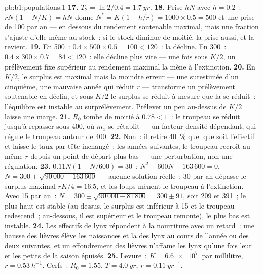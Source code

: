 \begin{solution}{pb:b1:populations:1}
\textbf{17.} $T_2 = \ln 2/0.4 = \qty{1.7}{yr}$.
\textbf{18.} Prise $hN$ avec $h = 0.2$~: $rN(1 - N/K) = hN$ donne $N^* =
K(1 - h/r) = 1000\times 0.5 = 500$ et une prise de \num{100} par an ---
en dessous du rendement soutenable maximal, mais une fraction s'ajuste
d'elle-même au stock~: si le stock diminue de moitié, la prise aussi, et
la  revient.
\textbf{19.} En 500~: $0.4\times 500\times 0.5 = 100 < 120$~: la
 décline. En 300~: $0.4\times 300\times 0.7 = 84 < 120$~: elle
décline plus vite --- une fois sous $K/2$, un prélèvement fixe supérieur
au rendement maximal la mène à l'extinction.
\textbf{20.} En $K/2$, le surplus est maximal mais la moindre erreur ---
une  surestimée d'un cinquième, une mauvaise année qui réduit
$r$ --- transforme un prélèvement soutenable en déclin, et sous $K/2$ le
surplus se réduit à mesure que la  se réduit~: l'équilibre est
instable au surprélèvement. Prélever un peu au-dessus de $K/2$ laisse
une marge.
\textbf{21.} $R_0$ tombe de moitié à $0.78 < 1$~: le troupeau se réduit
jusqu'à repasser sous 400, où $m_x$ se rétablit --- un facteur
densité-dépendant, qui régule le troupeau autour de 400.
\textbf{22.} Non~: il retire \qty{40}{\%} quel que soit l'effectif et
laisse le taux par tête inchangé~; les années suivantes, le troupeau
recroît au même $r$ depuis un point de départ plus bas --- une
perturbation, non une régulation.
\textbf{23.} $0.11N(1 - N/600) = 30$~: $N^2 - 600N + 163\,600 = 0$,
$N = 300\pm\sqrt{90\,000 - 163\,600}$ --- aucune solution réelle~: 30 par
an dépasse le surplus maximal $rK/4 = 16.5$, et les loups mènent le
troupeau à l'extinction. Avec 15 par an~: $N = 300\pm\sqrt{90\,000 -
81\,800} = 300\pm 91$, soit 209 et 391~; le plus haut est stable
(au-dessus, le surplus est inférieur à 15 et le troupeau redescend~;
au-dessous, il est supérieur et le troupeau remonte), le plus bas est
instable.
\textbf{24.} Les effectifs de lynx répondent à la nourriture avec un
retard~: une hausse des lièvres élève les naissances et la  des
lynx au cours de l'année ou des deux suivantes, et un effondrement des
lièvres n'affame les lynx qu'une fois leur  et les petits de la
saison épuisés.
\textbf{25.} Levure~: $K = \qty{6.6e7}{}$  par millilitre, $r =
\qty{0.53}{h^{-1}}$. Cerfs~: $R_0 = 1.55$, $T = \qty{4.0}{yr}$, $r =
\qty{0.11}{yr^{-1}}$.
\end{solution}
